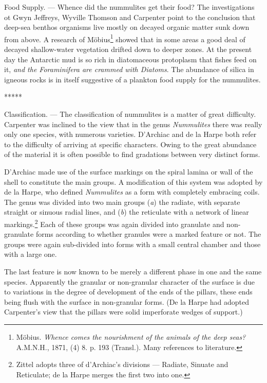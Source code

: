 \documentclass[a4paper, 12pt, oneside]{article}
\begin{document}
Food Supply. --- Whence did the nummulites get their food? The investigations ot Gwyn Jeffreys, Wyville Thomson and Carpenter point to the conclusion that deep-sea benthos organisms live mostly on decayed organic matter sunk down from above. A research of Möbius\footnote{Möbius. \emph{Whence comes the nourishment of the animals of the deep seas?} A.M.N.H., 1871, (4) 8. p. 193 (Transl.). Many references to literature.} showed that in some areas a good deal of decayed shallow-water vegetation drifted down to deeper zones. At the present day the Antarctic mud is so rich in diatomaceous protoplasm that fishes feed on it, \emph{and the Foraminifera are crammed with Diatoms}. The abundance of silica in igneous rocks is in itself suggestive of a plankton food supply for the nummulites.

\centerline{*\hspace{15mm}*\hspace{15mm}*\hspace{15mm}*\hspace{15mm}*}
\bigskip

Classification. --- The classification of nummulites is a matter of great difficulty. Carpenter was inclined to the view that in the genus \emph{Nummulites} there was really only one species, with numerous varieties. D'Archiac and de la Harpe both refer to the difficulty of arriving at specific characters. Owing to the great abundance of the material it is often possible to find gradations between very distinct forms.

D'Archiac made use of the surface markings on the spiral lamina or wall of the shell to constitute the main groups. A modification of this system was adopted by de la Harpe, who defined \emph{Nummulites} as a form with completely embracing coils. The genus was divided into two main groups (\emph{a}) the radiate, with separate straight or sinuous radial lines, and (\emph{b}) the reticulate with a network of linear markings.\footnote{Zittel adopts three of d'Archiac's divisions --- Radiate, Sinuate and Reticulate; de la Harpe merges the first two into one.} Each of these groups was again divided into granulate and non-granulate forms according to whether granules were a marked feature or not. The groups were again sub-divided into forms with a small central chamber and those with a large one.

The last feature is now known to be merely a different phase in one and the same species. Apparently the granular or non-granular character of the surface is due to variations in the degree of development of the ends of the pillars, these ends being flush with the surface in non-granular forms. (De la Harpe had adopted Carpenter's view that the pillars were solid imperforate wedges of support.)
\end{document}
